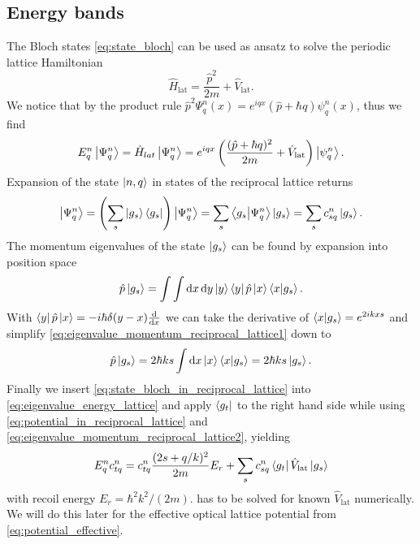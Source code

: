 \subsection{Energy bands}

The Bloch states \cref{eq:state_bloch} can be used as ansatz to solve the
periodic lattice Hamiltonian
\begin{equation}
  \hat{H}_\text{lat}
  =\frac{\hat{p}^2}{2m}+\hat{V}_\text{lat}
  \label{eq:hamiltonian_lattice}.
\end{equation}
We notice that by the product rule
$\hat{p}^2\Psi^n_q(x)=e^{iqx}(\hat{p}+\hbar q)\psi^n_q(x)$,
thus we find
\begin{equation}
  E^n_q\ket{\Psi^n_{q}}
  =\hat{H}_{lat}\ket{\Psi^n_{q}}
  =e^{iqx}\left(\frac{(\hat{p}+\hbar q)^2}{2m}+\hat{V}_\text{lat}\right)\ket{\psi^n_{q}}
  \label{eq:eigenvalue_energy_lattice}.
\end{equation}
Expansion of the state $\ket{n,q}$ in states of the reciprocal lattice returns
\begin{equation}
  \ket{\Psi^n_q}
  =\left(\sum_s\ket{g_s}\bra{g_s}\right)\ket{\Psi^n_q}
  =\sum_s\braket{g_s}{\Psi^n_q}\ket{g_s}
  =\sum_sc^n_{sq}\ket{g_s}
  \label{eq:state_bloch_in_reciprocal_lattice}.
\end{equation}
The momentum eigenvalues of the state $\ket{g_s}$ can be found by expansion
into position space
\begin{equation}
  \hat{p}\ket{g_s}
  =\int\int\dd{x}\dd{y}\ket{y}\bra{y}\hat{p}\ket{x}\bra{x}\ket{g_s}
  \label{eq:eigenvalue_momentum_reciprocal_lattice1}.
\end{equation}
With $\bra{y}\hat{p}\ket{x}=-i\hbar\delta(y-x)\dv{x}$ we can take the
derivative of $\bra{x}\ket{g_s}=e^{2ikxs}$ and simplify
\cref{eq:eigenvalue_momentum_reciprocal_lattice1} down to
\begin{equation}
  \hat{p}\ket{g_s}
  =2\hbar ks\int\dd{x}\ket{x}\bra{x}\ket{g_s}
  =2\hbar ks\ket{g_s}
  \label{eq:eigenvalue_momentum_reciprocal_lattice2}.
\end{equation}
Finally we insert \cref{eq:state_bloch_in_reciprocal_lattice} into
\cref{eq:eigenvalue_energy_lattice} and apply $\bra{g_t}$ to the
right hand side while using \cref{eq:potential_in_reciprocal_lattice} and
\cref{eq:eigenvalue_momentum_reciprocal_lattice2}, yielding
\begin{equation}
  E^n_qc^n_{tq}
  =c^n_{tq}\frac{(2s+q/k)^2}{2m}E_r+\sum_sc^n_{sq}\bra{g_t}\hat{V}_\text{lat}\ket{g_s}
  \label{eq:eigenvalue_energy_lattice_explicit}
\end{equation}
with recoil energy $E_r=\hbar^2k^2/(2m)$.
 has to be solved for known
$\hat{V}_\text{lat}$ numerically. We will do this later for the effective
optical lattice potential from \cref{eq:potential_effective}.

